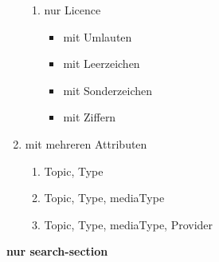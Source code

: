 \begin{enumerate}
\begin{enumerate}
        \item nur Licence
        \begin{itemize}
           \item mit Umlauten
           \item mit Leerzeichen
           \item mit Sonderzeichen
           \item mit Ziffern
        \end{itemize}
    \end{enumerate} %
    \item mit mehreren Attributen
    \begin{enumerate}
        \item Topic, Type
	     \item Topic, Type, mediaType
	     \item Topic, Type, mediaType, Provider
     \end{enumerate}
  \end{enumerate} %



\pagebreak


\flushleft \textbf{nur search-section}

